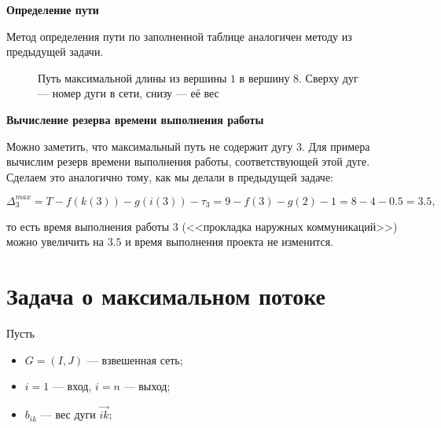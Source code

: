 \bigskip

\textbf{Определение пути}

Метод определения пути по заполненной таблице аналогичен методу из предыдущей задачи.

\begin{figure}[H]
	\centering	
	\caption{Путь максимальной длины из вершины $1$ в вершину $8$. Сверху дуг --- номер дуги в сети, снизу --- её вес}
\end{figure}

\bigskip

\textbf{Вычисление резерва времени выполнения работы}

Можно заметить, что максимальный путь не содержит дугу $3$. Для примера вычислим резерв времени выполнения работы, соответствующей этой дуге. Сделаем это аналогично тому, как мы делали в предыдущей задаче:

\[
\Delta^{max}_3 = T - f(k(3)) - g(i(3)) - \tau_3 = 9 - f(3) - g(2) - 1 = 8 - 4 - 0.5 = 3.5,
\]

то есть время выполнения работы $3$ (<<прокладка наружных коммуникаций>>) можно увеличить на $3.5$ и время выполнения проекта не изменится.

\section{Задача о максимальном потоке}


Пусть
\begin{itemize}[nosep]
	\item $G = (I, J)$ --- взвешенная сеть;
	
	\item $i = 1$ --- вход, $i = n$ --- выход;
	
	\item $b_{ik}$ --- вес дуги $\vec{ik}$;
\end{itemize}

